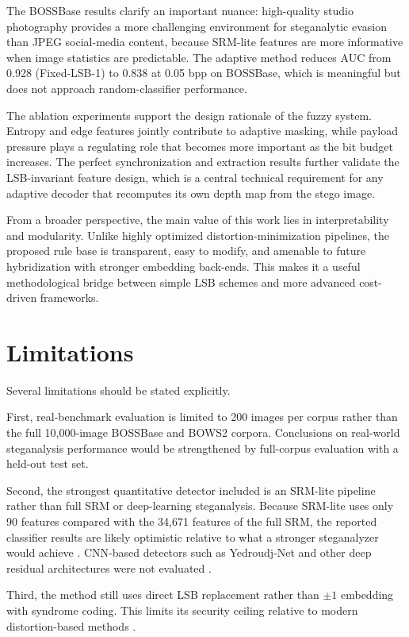 The BOSSBase results clarify an important nuance: high-quality studio photography provides a more challenging environment for steganalytic evasion than JPEG social-media content, because SRM-lite features are more informative when image statistics are predictable. The adaptive method reduces AUC from 0.928 (Fixed-LSB-1) to 0.838 at 0.05 bpp on BOSSBase, which is meaningful but does not approach random-classifier performance.

The ablation experiments support the design rationale of the fuzzy system. Entropy and edge features jointly contribute to adaptive masking, while payload pressure plays a regulating role that becomes more important as the bit budget increases. The perfect synchronization and extraction results further validate the LSB-invariant feature design, which is a central technical requirement for any adaptive decoder that recomputes its own depth map from the stego image.

From a broader perspective, the main value of this work lies in interpretability and modularity. Unlike highly optimized distortion-minimization pipelines, the proposed rule base is transparent, easy to modify, and amenable to future hybridization with stronger embedding back-ends. This makes it a useful methodological bridge between simple LSB schemes and more advanced cost-driven frameworks.

\section{Limitations}
Several limitations should be stated explicitly.

First, real-benchmark evaluation is limited to 200 images per corpus rather than the full 10,000-image BOSSBase and BOWS2 corpora. Conclusions on real-world steganalysis performance would be strengthened by full-corpus evaluation with a held-out test set.

Second, the strongest quantitative detector included is an SRM-lite pipeline rather than full SRM or deep-learning steganalysis. Because SRM-lite uses only 90 features compared with the 34,671 features of the full SRM, the reported classifier results are likely optimistic relative to what a stronger steganalyzer would achieve \cite{fridrich2012rich,kodovsky2012ensemble}. CNN-based detectors such as Yedroudj-Net and other deep residual architectures were not evaluated \cite{yedroudj2018,boroumand2019}.

Third, the method still uses direct LSB replacement rather than $\pm 1$ embedding with syndrome coding. This limits its security ceiling relative to modern distortion-based methods \cite{filler2011,holub2014}.

